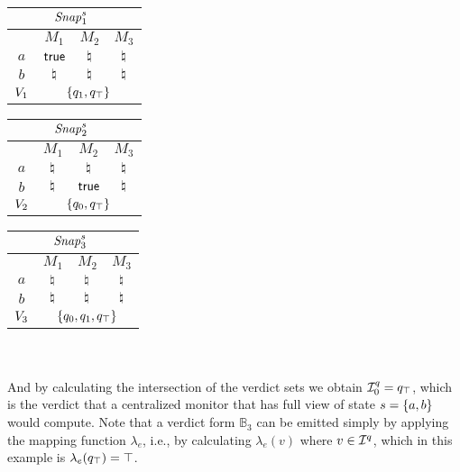  \begin{tabular}{|c|c|c|c|}
   \multicolumn{1}{r}{} &  \multicolumn{2}{c}{ {$\mathit{Snap}_1^s$}}\\
\hline
  & $M_1$ & $M_2$ & $M_3$\\
 \hline
   $a$ & $\mathsf{true}$ & $\natural$ & $\natural$\\
   $b$ & $\natural$ & $\natural$ & $\natural$\\
\hline
  $V_1$  &  \multicolumn{3}{c|}{\cellcolor{gray!25}$\{q_1, q_\top\}$}\\
\hline
  \end{tabular}  
\quad
 \begin{tabular}{|c|c|c|c|}
   \multicolumn{1}{r}{} &  \multicolumn{2}{c}{ {$\mathit{Snap}_2^s$}}\\
\hline
  & $M_1$ & $M_2$ & $M_3$\\
 \hline
   $a$ & $\natural$ & $\natural$ & $\natural$\\
   $b$ & $\natural$ & $\mathsf{true}$ & $\natural$\\
\hline
  $V_2$  &  \multicolumn{3}{c|}{\cellcolor{gray!25}$\{q_0, q_\top\}$}\\
\hline
  \end{tabular}
\quad
 \begin{tabular}{|c|c|c|c|}
   \multicolumn{1}{r}{} &  \multicolumn{2}{c}{ {$\mathit{Snap}_3^s$}}\\
\hline
  & $M_1$ & $M_2$ & $M_3$\\
 \hline
   $a$ & $\natural$ & $\natural$ & $\natural$\\
   $b$ & $\natural$ & $\natural$ & $\natural$\\
\hline
  $V_3$  &  \multicolumn{3}{c|}{\cellcolor{gray!25}$\{q_0, q_1, q_\top\}$}\\
\hline
  \end{tabular}   \\ \\




And by calculating the intersection of the verdict sets we obtain $\mathcal{I}^q_0 = q_\top$, which is the verdict that a centralized monitor that has full view of state $s = \{a, b\}$ would compute. Note that a verdict form $\mathbb{B}_3$ can be emitted simply by applying the mapping function $\lambda_e$, i.e., by calculating $\lambda_e(v)$ where $v \in \mathcal{I}^q$, which in this example is $\lambda_e(q_\top) = \top$.









